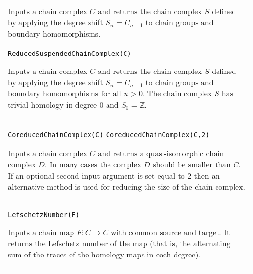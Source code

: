\documentclass[a4paper,11pt]{report}
\begin{document}
{\begin{center}
\begin{tabular}{|l|}
 Inputs a chain complex $C$ and returns the chain complex $S$ defined by applying the degree shift $S_n = C_{n-1}$ to chain groups and boundary homomorphisms. \\
 \index{ReducedSuspendedChainComplex} \texttt{ReducedSuspendedChainComplex(C)} 

 Inputs a chain complex $C$ and returns the chain complex $S$ defined by applying the degree shift $S_n = C_{n-1}$ to chain groups and boundary homomorphisms for all $n > 0$. The chain complex $S$ has trivial homology in degree $0$ and $S_0=\mathbb Z$. \\
 \index{CoreducedChainComplex} \texttt{CoreducedChainComplex(C)} \texttt{CoreducedChainComplex(C,2)} 

 Inputs a chain complex $C$ and returns a quasi-isomorphic chain complex $D$. In many cases the complex $D$ should be smaller than $C$. If an optional second input argument is set equal to 2 then an alternative
method is used for reducing the size of the chain complex. \\
 \index{LefschetzNumber} \texttt{LefschetzNumber(F)} 

 Inputs a chain map $F\colon C\rightarrow C$ with common source and target. It returns the Lefschetz number of the map
(that is, the alternating sum of the traces of the homology maps in each
degree). \\
\end{tabular}\\[2mm]
\end{center}

 }

 
\end{document}
